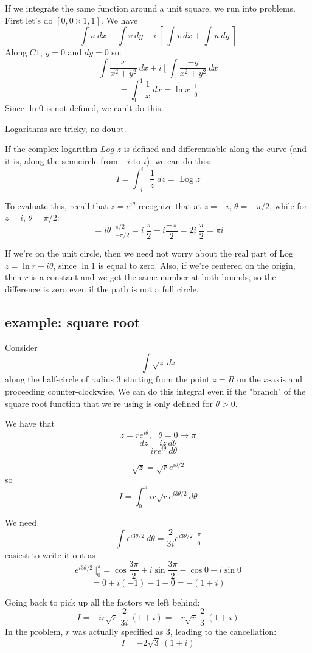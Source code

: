 \documentclass[11pt, oneside]{article}
\begin{document}
If we integrate the same function around a unit square, we run into problems.  First let's  do $[0,0 \times 1,1]$.  We have
\[ \int u \ dx - \int v \ dy + i \ [ \ \int v \ dx + \int u \ dy \ ]  \]
Along $C1$, $y = 0$ and $dy = 0$ so:
\[ \int \frac{x}{x^2 + y^2} \ dx + i \ [ \ \int \frac{-y}{x^2 + y^2} \ dx \]
\[ = \int_0^1 \frac{1}{x} \ dx = \ln x \ \bigg |_0^1 \]
Since $\ln 0$ is not defined, we can't do this.

Logarithms are tricky, no doubt.  

If the complex logarithm $Log$ $z$ is defined and differentiable along the curve (and it is, along the semicircle from $-i$ to $i$), we can do this:
\[ I = \int_{-i}^i \frac{1}{z} \ dz = \text{ Log } z  \]

To evaluate this, recall that $z = e^{i\theta}$ recognize that at $z = -i$, $\theta = - \pi/2$, while for $z = i$, $\theta = \pi/2$:
\[ = i \theta \ \bigg |_{-\pi/2}^{\pi/2} =  i \ \frac{\pi}{2}  -  i \frac{-\pi}{2}  = 2i \ \frac{\pi}{2} = \pi i \]

If we're on the unit circle, then we need not worry about the real part of Log $z = \ln r + i \theta$, since $\ln 1$ is equal to zero.  Also, if we're centered on the origin, then $r$ is a constant and we get the same number at both bounds, so the difference is zero even if the path is not a full circle.

\subsection*{example: square root}
Consider
\[ \int \sqrt{z} \ dz \]
along the half-circle of radius $3$ starting from the point $z = R$ on the $x$-axis and proceeding counter-clockwise.
We can do this integral even if the "branch" of the square root function that we're using is only defined for $\theta > 0$.  

We have that 
\[ z = re^{i\theta}, \ \ \ \theta = 0 \rightarrow \pi \]
\[ dz = iz \ d \theta \]
\[ = ire^{i\theta} \ d \theta \]

\[ \sqrt{z} = \sqrt{r} e^{i\theta/2} \]
so
\[ I = \int_0^{\pi} ir \sqrt{r} e^{i3\theta/2} \ d \theta \]

We need
\[ \int e^{i3\theta/2} \ d \theta = \frac{2}{3i} e^{i3\theta/2} \ \bigg |_0^{\pi} \]
easiest to write it out as
\[ e^{i3\theta/2} \ \bigg |_0^{\pi} = \cos \frac{3\pi}{2} + i \sin  \frac{3\pi}{2} - \cos 0 - i \sin 0 \]
\[ = 0 + i(-1) - 1 - 0 = -(1+i) \]

Going back to pick up all the factors we left behind:
\[ I = -ir \sqrt{r} \ \frac{2}{3i} \ (1+i) = -r \sqrt{r} \ \frac{2}{3} \ (1+i) \]
In the problem, $r$ was actually specified as $3$, leading to the cancellation:
\[ I = - 2 \sqrt{3} \ (1+i) \]
\end{document}
